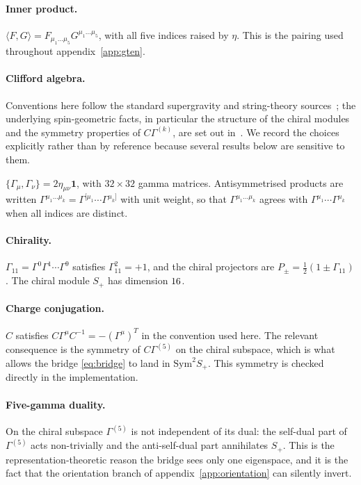 \paragraph{Inner product.}
$\langle F, G\rangle = F_{\mu_1\dots\mu_5}G^{\mu_1\dots\mu_5}$, with all five
indices raised by $\eta$. This is the pairing used throughout
appendix~\ref{app:gten}.

\paragraph{Clifford algebra.}
Conventions here follow the standard supergravity and string-theory
sources~\cite{VanProeyen:1999ni,Freedman:2012zz,Polchinski:1998rr,GreenSchwarzWitten:1987};
the underlying spin-geometric facts, in particular the
structure of the chiral modules and the symmetry properties of
$C\Gamma^{(k)}$, are set out in~\cite{Lawson:1989}. We record the choices
explicitly rather than by reference because several results below are sensitive
to them.

$\{\Gamma_\mu, \Gamma_\nu\} = 2\eta_{\mu\nu}\mathbf{1}$, with
$32\times 32$ gamma matrices. Antisymmetrised products are written
$\Gamma^{\mu_1\dots\mu_k} = \Gamma^{[\mu_1}\cdots\Gamma^{\mu_k]}$ with unit
weight, so that $\Gamma^{\mu_1\dots\mu_k}$ agrees with
$\Gamma^{\mu_1}\cdots\Gamma^{\mu_k}$ when all indices are distinct.

\paragraph{Chirality.}
$\Gamma_{11} = \Gamma^0\Gamma^1\cdots\Gamma^9$ satisfies $\Gamma_{11}^2 = +1$,
and the chiral projectors are $P_\pm = \tfrac12(1\pm\Gamma_{11})$. The chiral
module $S_+$ has dimension $16$.

\paragraph{Charge conjugation.}
$C$ satisfies $C\Gamma^\mu C^{-1} = -(\Gamma^\mu)^{T}$ in the convention used
here. The relevant consequence is the symmetry of $C\Gamma^{(5)}$ on the chiral
subspace, which is what allows the bridge \eqref{eq:bridge} to land in
$\mathrm{Sym}^2 S_+$. This symmetry is checked directly in the implementation.

\paragraph{Five-gamma duality.}
On the chiral subspace $\Gamma^{(5)}$ is not independent of its dual: the
self-dual part of $\Gamma^{(5)}$ acts non-trivially and the anti-self-dual part
annihilates $S_+$. This is the representation-theoretic reason the bridge sees
only one eigenspace, and it is the fact that the orientation branch of
appendix~\ref{app:orientation} can silently invert.

